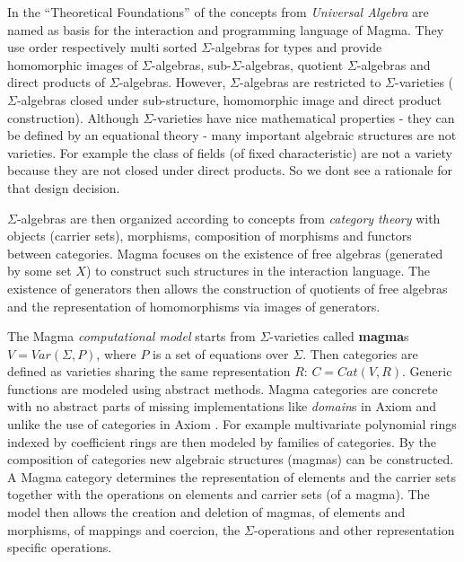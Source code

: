 \documentclass{llncs}
\begin{document}
In the ``Theoretical Foundations'' of \cite{BosmaCannonPlayoust:1997}
the concepts from {\em Universal Algebra} are named as basis for the
interaction and programming language of Magma. They use order
respectively multi sorted $\Sigma$-algebras for types and provide
homomorphic images of $\Sigma$-algebras, sub-$\Sigma$-algebras,
quotient $\Sigma$-algebras and direct products of $\Sigma$-algebras.
%
However, $\Sigma$-algebras are restricted to $\Sigma$-varieties
($\Sigma$-algebras closed under sub-structure, homomorphic image and
direct product construction).
Although $\Sigma$-varieties have nice mathematical properties - they
can be defined by an equational theory
- many important algebraic structures are not
varieties. For example the class of fields (of fixed characteristic)
are not a variety because they are not closed under direct products.
So we dont see a rationale for that design decision.

$\Sigma$-algebras are then organized according to concepts from {\em
  category theory} with objects (carrier sets), morphisms, composition
of morphisms and functors between categories. Magma focuses on the
existence of free algebras (generated by some set $X$) to construct
such structures in the interaction language. The existence of
generators then allows the construction of quotients of free algebras
and the representation of homomorphisms via images of generators.

The Magma {\em computational model} starts from $\Sigma$-varieties
called {\bf magma}s $V = Var(\Sigma,P)$, where $P$ is a set of
equations over $\Sigma$. Then categories are defined as varieties
sharing the same representation $R$: $C = Cat(V,R)$. Generic functions
are modeled using abstract methods.
Magma categories are concrete with no abstract parts of missing
implementations like {\em domain}s in Axiom and unlike the use of
categories in Axiom \cite{JenksSutor:1992}.  For example multivariate
polynomial rings indexed by coefficient rings are then modeled by
families of categories.  By the composition of categories new algebraic
structures (magmas) can be constructed. A Magma category determines
the representation of elements and the carrier sets together with the
operations on elements and carrier sets (of a magma).
%
The model then allows the creation and deletion of magmas, of elements
and morphisms, of mappings and coercion, the $\Sigma$-operations and
other representation specific operations.
\end{document}

